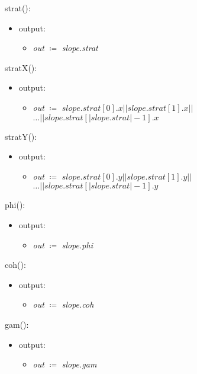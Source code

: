 \documentclass[12pt, titlepage]{article}
\begin{document}
\noindent strat():
\begin{itemize}
	\item output:
	\begin{itemize}
		\item[] \textit{out} $\coloneqq$ \textit{slope.strat}\\
	\end{itemize}
\end{itemize}

\noindent stratX():
\begin{itemize}
	\item output:
	\begin{itemize}
		\item[] \textit{out} $\coloneqq$ $slope.strat[0].x || 
		slope.strat[1].x ||$\\$ \dots || slope.strat[| 
		slope.strat|-1].x$\\
	\end{itemize}
\end{itemize}

\noindent stratY():
\begin{itemize}
	\item output:
	\begin{itemize}
		\item[] \textit{out} $\coloneqq$ $slope.strat[0].y || 
		slope.strat[1].y ||$\\$ \dots || slope.strat[| 
		slope.strat|-1].y$\\
	\end{itemize}
\end{itemize}

\noindent phi():
\begin{itemize}
	\item output:
	\begin{itemize}
		\item[] \textit{out} $\coloneqq$ \textit{slope.phi}\\
	\end{itemize}
\end{itemize}

\noindent coh():
\begin{itemize}
	\item output:
	\begin{itemize}
		\item[] \textit{out} $\coloneqq$ \textit{slope.coh}\\
	\end{itemize}
\end{itemize}

\noindent gam():
\begin{itemize}
	\item output:
	\begin{itemize}
		\item[] \textit{out} $\coloneqq$ \textit{slope.gam}\\
	\end{itemize}
\end{itemize}
\end{document}

